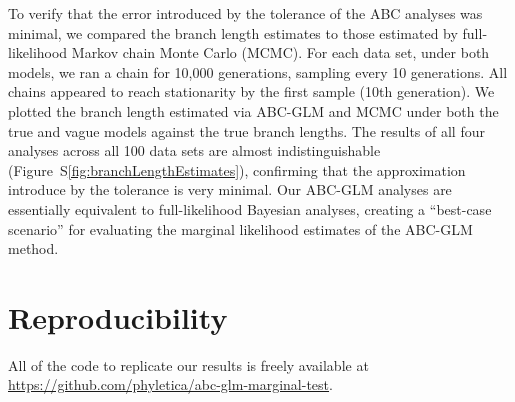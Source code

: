 To verify that the error introduced by the tolerance of the ABC analyses was
minimal, we compared the branch length estimates to those estimated by
full-likelihood Markov chain Monte Carlo (MCMC).
For each data set, under both models, we ran a chain for 10,000 generations,
sampling every 10 generations.
All chains appeared to reach stationarity by the first sample (10th
generation).
We plotted the branch length estimated via ABC-GLM and MCMC under both
the true and vague models against the true branch lengths.
The results of all four analyses across all 100 data sets are almost
indistinguishable (Figure~S\ref{fig:branchLengthEstimates}), confirming that
the approximation introduce by the tolerance is very minimal.
Our ABC-GLM analyses are essentially equivalent to full-likelihood Bayesian
analyses, creating a ``best-case scenario'' for evaluating the marginal
likelihood estimates of the ABC-GLM method.

\section{Reproducibility}
All of the code to replicate our results is freely available at
\href{https://github.com/phyletica/abc-glm-marginal-test}{https://github.com/phyletica/abc-glm-marginal-test}.

